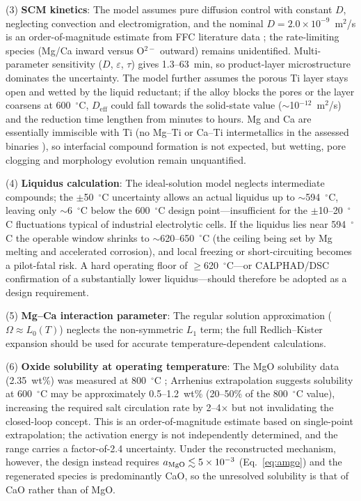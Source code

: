 \documentclass[11pt]{article}
\begin{document}
(3) \textbf{SCM kinetics}: The model assumes pure diffusion control with constant $D$, neglecting convection and electromigration, and the nominal $D = 2.0\times10^{-9}$~m$^2$/s is an order-of-magnitude estimate from FFC literature data \cite{fray2000,yan2007}; the rate-limiting species (Mg/Ca inward versus O$^{2-}$ outward) remains unidentified. Multi-parameter sensitivity ($D$, $\varepsilon$, $\tau$) gives 1.3--63~min, so product-layer microstructure dominates the uncertainty. The model further assumes the porous Ti layer stays open and wetted by the liquid reductant; if the alloy blocks the pores or the layer coarsens at 600~$^{\circ}$C, $D_{\mathrm{eff}}$ could fall towards the solid-state value ($\sim$10$^{-12}$~m$^2$/s) and the reduction time lengthen from minutes to hours. Mg and Ca are essentially immiscible with Ti (no Mg--Ti or Ca--Ti intermetallics in the assessed binaries \cite{hallstedt2025}), so interfacial compound formation is not expected, but wetting, pore clogging and morphology evolution remain unquantified.

(4) \textbf{Liquidus calculation}: The ideal-solution model neglects intermediate compounds; the $\pm$50~$^{\circ}$C uncertainty allows an actual liquidus up to $\sim$594~$^{\circ}$C, leaving only $\sim$6~$^{\circ}$C below the 600~$^{\circ}$C design point---insufficient for the $\pm$10--20~$^{\circ}$C fluctuations typical of industrial electrolytic cells. If the liquidus lies near 594~$^{\circ}$C the operable window shrinks to $\sim$620--650~$^{\circ}$C (the ceiling being set by Mg melting and accelerated corrosion), and local freezing or short-circuiting becomes a pilot-fatal risk. A hard operating floor of $\geq$620~$^{\circ}$C---or CALPHAD/DSC confirmation of a substantially lower liquidus---should therefore be adopted as a design requirement.

(5) \textbf{Mg--Ca interaction parameter}: The regular solution approximation ($\Omega \approx L_0(T)$) neglects the non-symmetric $L_1$ term; the full Redlich--Kister expansion \cite{zhang2008mgce} should be used for accurate temperature-dependent calculations.

(6) \textbf{Oxide solubility at operating temperature}: The MgO solubility data (2.35~wt\%) was measured at 800~$^{\circ}$C \cite{morita2004}; Arrhenius extrapolation suggests solubility at 600~$^{\circ}$C may be approximately 0.5--1.2~wt\% (20--50\% of the 800~$^{\circ}$C value), increasing the required salt circulation rate by 2--4$\times$ but not invalidating the closed-loop concept. This is an order-of-magnitude estimate based on single-point extrapolation; the activation energy is not independently determined, and the range carries a factor-of-2.4 uncertainty. Under the reconstructed mechanism, however, the design instead requires $a_{\ce{MgO}} \lesssim 5\times10^{-3}$ (Eq.~\ref{eq:amgo}) and the regenerated species is predominantly CaO, so the unresolved solubility is that of CaO rather than of MgO.
\end{document}

